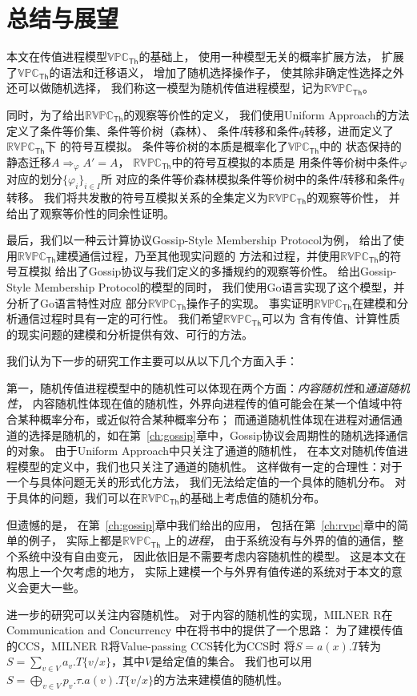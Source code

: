 \chapter{总结与展望}

本文在传值进程模型$\mathbb{VPC}_{\mathsf{Th}}$的基础上，
使用一种模型无关的概率扩展方法，
扩展了$\mathbb{VPC}_{\mathsf{Th}}$的语法和迁移语义，
增加了随机选择操作子，
使其除非确定性选择之外还可以做随机选择，
我们称这一模型为随机传值进程模型，记为$\mathbb{RVPC}_{\mathsf{Th}}$。

同时，为了给出$\mathbb{RVPC}_{\mathsf{Th}}$的观察等价性的定义，
我们使用Uniform Approach的方法定义了条件等价集、条件等价树（森林）、
条件$l$转移和条件$q$转移，进而定义了$\mathbb{RVPC}_{\mathsf{Th}}$下
的符号互模拟。
条件等价树的本质是概率化了$\mathbb{VPC}_{\mathsf{Th}}$中的
状态保持的静态迁移$A\Rightarrow_{\varphi}A'=A$，
$\mathbb{RVPC}_{\mathsf{Th}}$中的符号互模拟的本质是
用条件等价树中条件$\varphi$对应的划分$\{\varphi_i\}_{i\in I}$所
对应的条件等价森林模拟条件等价树中的条件$l$转移和条件$q$转移。
我们将共发散的符号互模拟关系的全集定义为$\mathbb{RVPC}_{\mathsf{Th}}$的观察等价性，
并给出了观察等价性的同余性证明。

最后，我们以一种云计算协议Gossip-Style Membership Protocol为例，
给出了使用$\mathbb{RVPC}_{\mathsf{Th}}$建模通信过程，乃至其他现实问题的
方法和过程，并使用$\mathbb{RVPC}_{\mathsf{Th}}$的符号互模拟
给出了Gossip协议与我们定义的多播规约的观察等价性。
给出Gossip-Style Membership Protocol的模型的同时，
我们使用Go语言实现了这个模型，并分析了Go语言特性对应
部分$\mathbb{RVPC}_{\mathsf{Th}}$操作子的实现。
事实证明$\mathbb{RVPC}_{\mathsf{Th}}$在建模和分析通信过程时具有一定的可行性。
我们希望$\mathbb{RVPC}_{\mathsf{Th}}$可以为
含有传值、计算性质的现实问题的建模和分析提供有效、可行的方法。

我们认为下一步的研究工作主要可以从以下几个方面入手：

第一，随机传值进程模型中的随机性可以体现在两个方面：\textit{内容随机性}和\textit{通道随机性}，
内容随机性体现在值的随机性，外界向进程传的值可能会在某一个值域中符合某种概率分布，或近似符合某种概率分布；
而通道随机性体现在进程对通信通道的选择是随机的，如在第~\ref{ch:gossip}章中，Gossip协议会周期性的随机选择通信的对象。
由于Uniform Approach中只关注了通道的随机性，
在本文对随机传值进程模型的定义中，我们也只关注了通道的随机性。
这样做有一定的合理性：对于一个与具体问题无关的形式化方法，
我们无法给定值的一个具体的随机分布。
对于具体的问题，我们可以在$\mathbb{RVPC}_{\mathsf{Th}}$的基础上考虑值的随机分布。

但遗憾的是，
在第~\ref{ch:gossip}章中我们给出的应用，
包括在第~\ref{ch:rvpc}章中的简单的例子，
实际上都是$\mathbb{RVPC}_{\mathsf{Th}}$
上的\textit{进程}，
由于系统没有与外界的值的通信，整个系统中没有自由变元，
因此依旧是不需要考虑内容随机性的模型。
这是本文在构思上一个欠考虑的地方，
实际上建模一个与外界有值传递的系统对于本文的意义会更大一些。

进一步的研究可以关注内容随机性。
对于内容的随机性的实现，MILNER R在Communication and Concurrency\cite{Milner_CCS}
中在将书中的提供了一个思路：
为了建模传值的CCS，MILNER R将Value-passing CCS转化为CCS时
将$S=a(x).T$转为$S=\sum_{v\in V} a_v.T\{v/x\}$，其中$V$是给定值的集合。
我们也可以用$S=\bigoplus_{v\in V}p_v.\tau.a(v).T\{v/x\}$的方法来建模值的随机性。